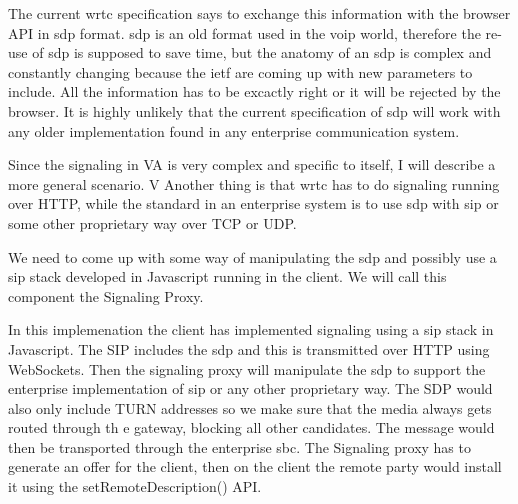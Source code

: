 The current \gls{wrtc} specification says to exchange this information with the browser API in \gls{sdp} format. \gls{sdp} is an old format used in the \gls{voip} world, therefore the re-use of \gls{sdp} is supposed to save time, but the anatomy of an \gls{sdp} is complex and constantly changing because the \gls{ietf} are coming up with new parameters to include. All the information has to be excactly right or it will be rejected by the browser. It is highly unlikely that the current specification of \gls{sdp} will work with any older implementation found in any enterprise communication system.

Since the signaling in VA is very complex and specific to itself, I will describe a more general scenario. V   Another thing is that \gls{wrtc} has to do signaling running over HTTP, while the standard in an enterprise system is to use \gls{sdp} with \gls{sip} or some other proprietary way over TCP or UDP.

We need to come up with some way of manipulating the \gls{sdp} and possibly use a \gls{sip} stack developed in Javascript running in the client. We will call this component the Signaling Proxy.


In this implemenation the client has implemented signaling using a \gls{sip} stack in Javascript. The SIP includes the \gls{sdp} and this is transmitted over HTTP using WebSockets. Then the signaling proxy will manipulate the \gls{sdp} to support the enterprise implementation of \gls{sip} or any other proprietary way. The SDP would also only include TURN addresses so we make sure that the media always gets routed through th e gateway, blocking all other candidates. The message would then be transported through the enterprise \gls{sbc}. The Signaling proxy has to generate an offer for the client, then on the client the remote party would install it using the setRemoteDescription() API.